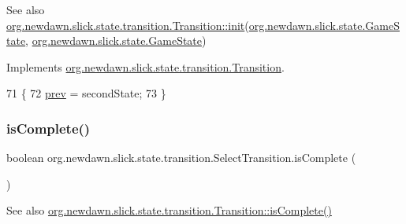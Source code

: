 \begin{DoxySeeAlso}{See also}
\mbox{\hyperlink{interfaceorg_1_1newdawn_1_1slick_1_1state_1_1transition_1_1_transition_a7b59f0c9205f1f0417ee18bc526e5b01}{org.\+newdawn.\+slick.\+state.\+transition.\+Transition\+::init}}(\mbox{\hyperlink{interfaceorg_1_1newdawn_1_1slick_1_1state_1_1_game_state}{org.\+newdawn.\+slick.\+state.\+Game\+State}}, \mbox{\hyperlink{interfaceorg_1_1newdawn_1_1slick_1_1state_1_1_game_state}{org.\+newdawn.\+slick.\+state.\+Game\+State}}) 
\end{DoxySeeAlso}


Implements \mbox{\hyperlink{interfaceorg_1_1newdawn_1_1slick_1_1state_1_1transition_1_1_transition_a7b59f0c9205f1f0417ee18bc526e5b01}{org.\+newdawn.\+slick.\+state.\+transition.\+Transition}}.


\begin{DoxyCode}
71                                                                   \{
72         \mbox{\hyperlink{classorg_1_1newdawn_1_1slick_1_1state_1_1transition_1_1_select_transition_a32a2ffe715329d58b89b2f48a6c6ddda}{prev}} = secondState;
73     \}
\end{DoxyCode}
\mbox{\label{classorg_1_1newdawn_1_1slick_1_1state_1_1transition_1_1_select_transition_a796e76c619629c113f7e1ccd312f3806}} 
\subsubsection{\texorpdfstring{is\+Complete()}{isComplete()}}
{\footnotesize\ttfamily boolean org.\+newdawn.\+slick.\+state.\+transition.\+Select\+Transition.\+is\+Complete (\begin{DoxyParamCaption}{ }\end{DoxyParamCaption})\hspace{0.3cm}{\ttfamily [inline]}}

\begin{DoxySeeAlso}{See also}
\mbox{\hyperlink{interfaceorg_1_1newdawn_1_1slick_1_1state_1_1transition_1_1_transition_af397d5185cf09c30c3f51d5021d63815}{org.\+newdawn.\+slick.\+state.\+transition.\+Transition\+::is\+Complete()}} 
\end{DoxySeeAlso}


